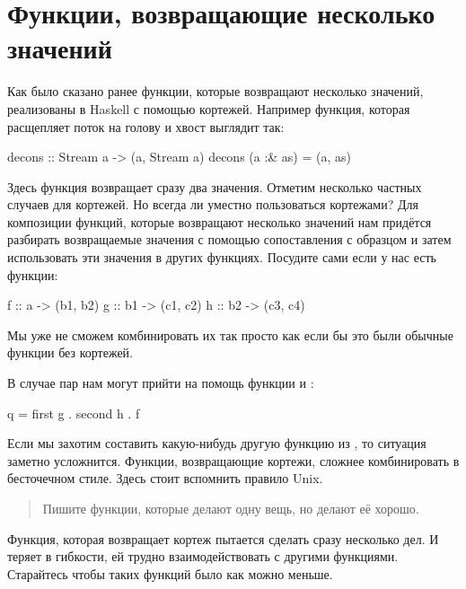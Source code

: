 \section{Функции, возвращающие несколько значений}

Как было сказано ранее функции, которые возвращают несколько 
значений, реализованы в Haskell с помощью кортежей. 
Например функция, которая расщепляет поток на голову и хвост выглядит так:

\begin{code}
decons :: Stream a -> (a, Stream a)
decons (a :& as) = (a, as)
\end{code}

Здесь функция возвращает сразу два значения. Отметим несколько
частных случаев для кортежей. Но всегда ли уместно пользоваться 
кортежами? Для композиции функций, которые возвращают несколько
значений нам придётся разбирать возвращаемые значения
с помощью сопоставления с образцом и затем использовать
эти значения в других функциях. Посудите сами если у нас
есть функции:

\begin{code}
f :: a  -> (b1, b2)
g :: b1 -> (c1, c2)
h :: b2 -> (c3, c4)
\end{code}

Мы уже не сможем комбинировать их так просто как если бы
это были обычные функции без кортежей. 


В случае пар нам могут прийти на помощь функции 
и :

\begin{code}
q = first g . second h . f
\end{code}

Если мы захотим составить какую-нибудь другую 
функцию из , то ситуация заметно усложнится. 
Функции, возвращающие кортежи, сложнее 
комбинировать в бесточечном стиле.
Здесь стоит вспомнить правило Unix. 

\begin{quote}
Пишите функции, которые делают одну вещь, но делают её хорошо. 
\end{quote}

Функция, которая возвращает кортеж пытается
сделать сразу несколько дел. И теряет в гибкости,
ей трудно взаимодействовать с другими функциями. 
Старайтесь чтобы таких функций было как можно меньше. 

